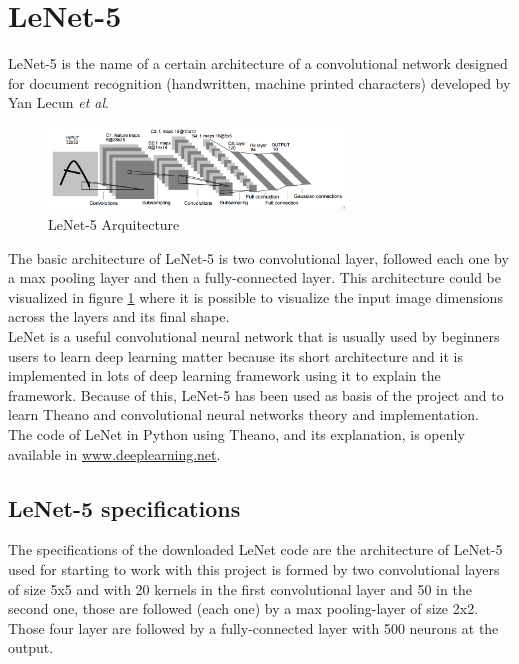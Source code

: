 \section{LeNet-5}
LeNet-5 \cite{Lenet5} is the name of a certain architecture of a convolutional network designed for document recognition (handwritten, machine printed characters) developed by Yan Lecun \textit{et al}.\\

\begin{figure}[htb]
  \centering
  \includegraphics[width=0.7\textwidth]{images/images_lenet/LenetArquitectura.png}
  \caption{LeNet-5 Arquitecture}
  \label{Lenet5Arquitectura}
\end{figure}

The basic architecture of LeNet-5 is two convolutional layer, followed each one by a max pooling layer and then a fully-connected layer. This architecture could be visualized in figure \ref{Lenet5Arquitectura} where it is possible to visualize the input image dimensions across the layers and its final shape.\\

LeNet is a useful convolutional neural network that is usually used by beginners users to learn deep learning matter because its short architecture and it is implemented in lots of deep learning framework using it to explain the framework. Because of this, LeNet-5 has been used as basis of the project and to learn Theano and convolutional neural networks theory and implementation.\\

The code of LeNet in Python using Theano, and its explanation, is openly available in \url{www.deeplearning.net}.\\

\subsection{LeNet-5 specifications}
The specifications of the downloaded LeNet code are the architecture of LeNet-5 used for starting to work with this project is formed by two convolutional layers of size 5x5 and with 20 kernels in the first convolutional layer and 50 in the second one, those are followed (each one) by a max pooling-layer of size 2x2. Those four layer are followed by a fully-connected layer with 500 neurons at the output.\\

